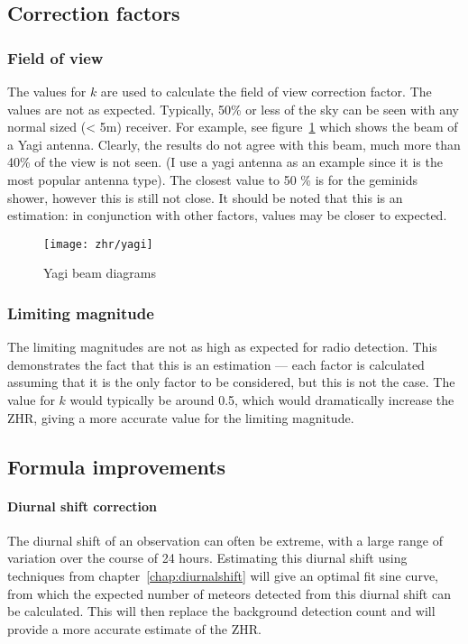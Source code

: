 \subsection{Correction factors}
\subsubsection{Field of view}
The values for $k$ are used to calculate the field of view correction factor. The values are not as expected. Typically, 50\% or less of the sky can be seen with any normal sized (< 5m) receiver. For example, see figure~\ref{fig:zhr:beam} which shows the beam of a Yagi antenna. Clearly, the results do not agree with this beam, much more than 40\% of the view is not seen. (I use a yagi antenna as an example since it is the most popular antenna type). The closest value to 50 \% is for the geminids shower, however this is still not close. It should be noted that this is an estimation: in conjunction with other factors, values may be closer to expected. 
\begin{figure}[h!]
	\centering
	\texttt{[image: zhr/yagi]}
	\caption{Yagi beam diagrams \cite{yagi}
		\label{fig:zhr:beam}}
\end{figure}
\subsubsection{Limiting magnitude}
The limiting magnitudes are not as high as expected for radio detection. This demonstrates the fact that this is an estimation --- each factor is calculated assuming that it is the only factor to be considered, but this is not the case. The value for $k$ would typically be around 0.5, which would dramatically increase the ZHR, giving a more accurate value for the limiting magnitude.
\subsection{Formula improvements}
\paragraph{Diurnal shift correction\\}
The diurnal shift of an observation can often be extreme, with a large range of variation over the course of 24 hours. Estimating this diurnal shift using techniques from chapter~\ref{chap:diurnalshift} will give an optimal fit sine curve, from which the expected number of meteors detected from this diurnal shift can be calculated. This will then replace the background detection count and will provide a more accurate estimate of the ZHR.
